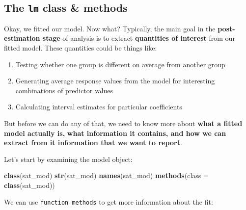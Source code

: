 \documentclass[
]{book}
\newenvironment{Shaded}{\begin{snugshade}}{\end{snugshade}}
\newcommand{\DataTypeTok}[1]{\textcolor[rgb]{0.13,0.29,0.53}{#1}}
\newcommand{\DecValTok}[1]{\textcolor[rgb]{0.00,0.00,0.81}{#1}}
\newcommand{\KeywordTok}[1]{\textcolor[rgb]{0.13,0.29,0.53}{\textbf{#1}}}
\newcommand{\NormalTok}[1]{#1}
\newcommand{\OperatorTok}[1]{\textcolor[rgb]{0.81,0.36,0.00}{\textbf{#1}}}
\newcommand{\StringTok}[1]{\textcolor[rgb]{0.31,0.60,0.02}{#1}}
\providecommand{\tightlist}{%
  \setlength{\itemsep}{0pt}\setlength{\parskip}{0pt}}
\begin{document}
\begin{Shaded}
\end{Shaded}

\hypertarget{the-lm-class-methods}{%
\subsection{\texorpdfstring{The \texttt{lm} class \& methods}{The lm class \& methods}}\label{the-lm-class-methods}}

Okay, we fitted our model. Now what? Typically, the main goal in the \textbf{post-estimation stage} of analysis
is to extract \textbf{quantities of interest} from our fitted model. These quantities could be things like:

\begin{enumerate}
\def\labelenumi{\arabic{enumi}.}
\tightlist
\item
  Testing whether one group is different on average from another group
\item
  Generating average response values from the model for interesting combinations of predictor values
\item
  Calculating interval estimates for particular coefficients
\end{enumerate}

But before we can do any of that, we need to know more about \textbf{what a fitted model actually is,}
\textbf{what information it contains, and how we can extract from it information that we want to report}.

Let's start by examining the model object:

\begin{Shaded}
\begin{Highlighting}[]
  \KeywordTok{class}\NormalTok{(sat_mod)}
  \KeywordTok{str}\NormalTok{(sat_mod)}
  \KeywordTok{names}\NormalTok{(sat_mod)}
  \KeywordTok{methods}\NormalTok{(}\DataTypeTok{class =} \KeywordTok{class}\NormalTok{(sat_mod))}
\end{Highlighting}
\end{Shaded}

We can use \texttt{function\ methods} to get more information about the fit:
\end{document}

